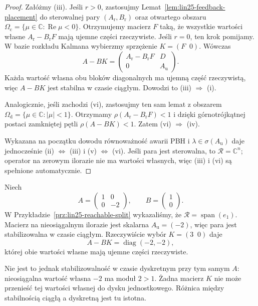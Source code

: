 \begin{proof}
Załóżmy (iii).
Jeśli \(r>0\),
zastosujmy
Lemat~\ref{lem:lin25-feedback-placement}
do sterowalnej pary
\((A_{\mathrm r},B_{\mathrm r})\)
oraz otwartego obszaru
\(\Omega_{\mathrm c}
 =\{\mu\in\mathbb C:
           \operatorname{Re}\mu<0\}\).
Otrzymujemy macierz \(F\)
taką, że wszystkie wartości
własne \(A_{\mathrm r}-B_{\mathrm r}F\)
mają ujemne części rzeczywiste.
Jeśli \(r=0\), ten krok pomijamy.
W bazie rozkładu Kalmana
wybierzmy sprzężenie
\(K=(F\;\;0)\).
Wówczas
\[
 A-BK=
 \begin{pmatrix}
 A_{\mathrm r}-B_{\mathrm r}F&D\\
 0&A_{\mathrm u}
 \end{pmatrix}.
\]
Każda wartość własna
obu bloków diagonalnych
ma ujemną część rzeczywistą,
więc \(A-BK\) jest stabilna
w czasie ciągłym.
Dowodzi to (iii) \(\Rightarrow\) (i).

Analogicznie,
jeśli zachodzi (vi),
zastosujmy ten sam lemat
z obszarem
\(\Omega_{\mathrm d}
 =\{\mu\in\mathbb C:|\mu|<1\}\).
Otrzymamy
\(\rho(A_{\mathrm r}-B_{\mathrm r}F)<1\)
i dzięki górnotrójkątnej
postaci zamkniętej pętli
\(\rho(A-BK)<1\).
Zatem (vi) \(\Rightarrow\) (iv).

Wykazana na początku dowodu
równoważność awarii PBH
i \(\lambda\in\sigma(A_{\mathrm u})\)
daje jednocześnie
(ii) \(\Leftrightarrow\) (iii)
i (v) \(\Leftrightarrow\) (vi).
Jeśli para jest sterowalna,
to \(\mathcal R=\mathbb C^n\);
operator na zerowym ilorazie
nie ma wartości własnych,
więc (iii) i (vi)
są spełnione automatycznie.
\end{proof}

\begin{przyklad}
\label{prz:lin25-stabilizable}
Niech
\[
 A=\begin{pmatrix}1&0\\0&-2\end{pmatrix},
 \qquad B=\begin{pmatrix}1\\0\end{pmatrix}.
\]
W Przykładzie~\ref{prz:lin25-reachable-split}
wykazaliśmy, że
\(\mathcal R=\operatorname{span}(e_1)\).
Macierz na nieosiągalnym
ilorazie jest skalarna
\(A_{\mathrm u}=(-2)\),
więc para jest stabilizowalna
w czasie ciągłym.
Rzeczywiście wybór
\(K=(3\;\;0)\)
daje
\[
 A-BK=\operatorname{diag}(-2,-2),
\]
której obie wartości własne
mają ujemne części rzeczywiste.

Nie jest to jednak
stabilizowalność w czasie
dyskretnym przy tym samym \(A\):
nieosiągalna wartość własna
\(-2\) ma moduł \(2>1\).
Żadna macierz \(K\)
nie może przenieść tej
wartości własnej do dysku
jednostkowego.
Różnica między stabilnością
ciągłą a dyskretną
jest tu istotna.
\end{przyklad}

